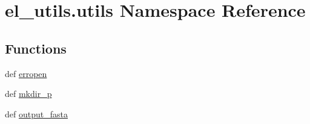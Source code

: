 \hypertarget{namespaceel__utils_1_1utils}{\section{el\-\_\-utils.\-utils Namespace Reference}
\label{namespaceel__utils_1_1utils}
}
\subsection*{Functions}
\begin{DoxyCompactItemize}
\item 
def \hyperlink{namespaceel__utils_1_1utils_a0634c87856218d815e8f60569b8df837}{erropen}
\item 
def \hyperlink{namespaceel__utils_1_1utils_a36c97578a66702087a11945c2b46cd70}{mkdir\-\_\-p}
\item 
def \hyperlink{namespaceel__utils_1_1utils_aa8ccd72ee449781652c8e6ed8da3d4f2}{output\-\_\-fasta}
\end{DoxyCompactItemize}


